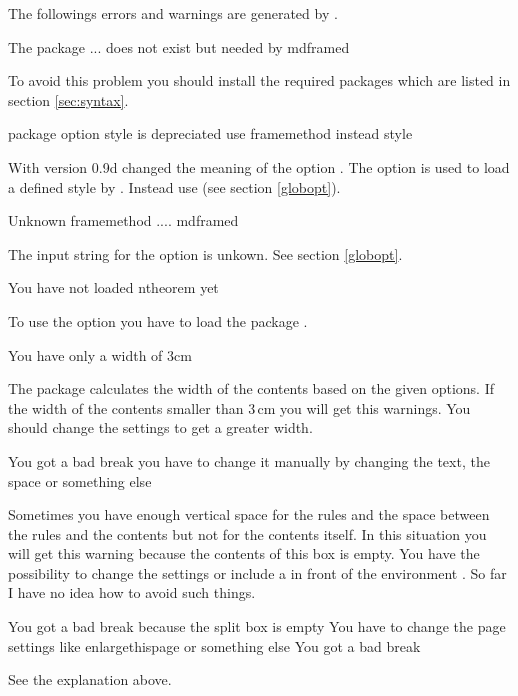 \documentclass[parskip=false,english,11pt]{ltxmdf}
\begin{document}
The followings errors and warnings are generated by .

\begin{mdexample}
  The package ...  does not exist but
   needed by mdframed
\end{mdexample}        
To avoid this problem you should install the required
packages which are listed in section \ref{sec:syntax}.

\begin{mdexample}
  package option style is depreciated
  use framemethod instead style
\end{mdexample}    
With version 0.9d \mdname changed the meaning of the option . The option is used to load a defined style by . Instead use  (see section \ref{globopt}). 

\begin{mdexample}
 Unknown framemethod .... mdframed
\end{mdexample}   
The input string for the option  is unkown. See section \ref{globopt}.

\begin{mdexample}
  You have not loaded ntheorem yet
\end{mdexample}   
To use the option  you have to 
load the package .

\begin{mdexample}
 You have only a width of 3cm
\end{mdexample}   
The package  calculates the width of the contents
based on the given options. If the width of the contents smaller than
3\,cm you will get this warnings. You should change the 
settings to get a greater width.

\begin{mdexample}
 You got a bad break
 you have to change it manually
 by changing the text, the space
 or something else
\end{mdexample} 
Sometimes you have enough vertical space for the rules and the space
between the rules and the contents but not for the contents itself.
In this situation you will get this warning because the contents
of this box is empty. You have the possibility to change the
settings or include a  in front of 
the environment .
So far I have no idea how to avoid such things.

\begin{mdexample}
 You got a bad break
 because the split box is empty
 You have to change the page settings
 like enlargethispage or something else
 You got a bad break
\end{mdexample} 
See the explanation above.
\end{document}
